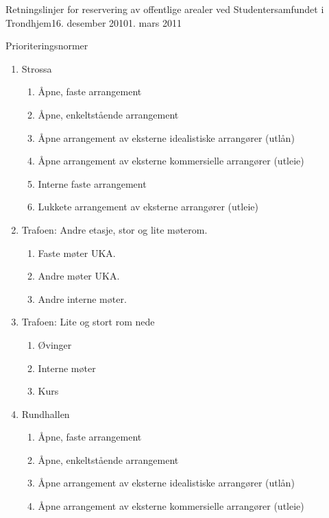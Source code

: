 \begin{instruks}{Retningslinjer for reservering av offentlige arealer
    ved Studentersamfundet i Trondhjem}{16. desember 2010}{1. mars 2011}
\begin{instruksledd}{Prioriteringsnormer}
\begin{enumerate}
\begin{enumerate}
\begin{enumerate}
                        \end{enumerate}
                        5 For eksempel stikkefest.
                    \item Strossa
                        \begin{enumerate}
                            \item  Åpne, faste arrangement
                            \item Åpne, enkeltstående arrangement
                            \item Åpne arrangement av eksterne idealistiske arrangører
                                (utlån)
                            \item Åpne arrangement av eksterne kommersielle arrangører
                                (utleie)
                            \item Interne faste arrangement
                            \item Lukkete arrangement av eksterne arrangører (utleie)
                        \end{enumerate}
		    \item Trafoen: Andre etasje, stor og lite møterom.
			\begin{enumerate}
			    \item Faste møter UKA.
			    \item Andre møter UKA.
			    \item Andre interne møter.		
			\end{enumerate}	
                    \item Trafoen: Lite og stort rom nede
                        \begin{enumerate}
                            \item Øvinger
                            \item Interne møter
                            \item Kurs
                        \end{enumerate}
                    \item Rundhallen
                        \begin{enumerate}
                            \item Åpne, faste arrangement
                            \item Åpne, enkeltstående arrangement
                            \item Åpne arrangement av eksterne idealistiske arrangører (utlån)
                            \item Åpne arrangement av eksterne kommersielle arrangører (utleie)

\end{enumerate}
\end{enumerate}
\end{enumerate}
\end{instruksledd}
\end{instruks}
